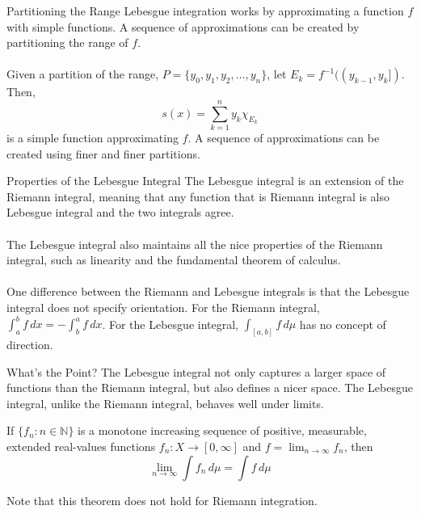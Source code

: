 \documentclass{beamer}
\begin{document}
\begin{frame}{Partitioning the Range}
    Lebesgue integration works by approximating a function $f$ with simple
    functions. A sequence of approximations can be created by partitioning
    the range of $f$.
    \\~\\
    Given a partition of the range, $P = \{y_0, y_1, y_2, \ldots, y_n\}$,
    let $E_k = f^{-1}((y_{k-1}, y_k])$. Then, 
    \[
      s(x) = \sum_{k=1}^{n} y_k \chi_{E_k}  
    \]
    is a simple function approximating $f$. A sequence of approximations
    can be created using finer and finer partitions.
\end{frame}


\begin{frame}{Properties of the Lebesgue Integral}
    The Lebesgue integral is an extension of the Riemann integral,
    meaning that any function that is Riemann integral is also
    Lebesgue integral and the two integrals agree.
    \\~\\
    The Lebesgue integral also maintains all the nice properties
    of the Riemann integral, such as linearity and the fundamental
    theorem of calculus.
    \\~\\
    One difference between the Riemann and Lebesgue integrals is that 
    the Lebesgue integral does not specify orientation. For the Riemann
    integral, $\int_a^b f\,dx = -\int_b^a f\,dx$. For the Lebesgue
    integral, $\int_{[a,b]} f\,d\mu$ has no concept of direction.  
\end{frame}

\begin{frame}{What's the Point?}
    The Lebesgue integral not only captures a larger space of 
    functions than the Riemann integral, but also defines
    a nicer space. The Lebesgue integral, unlike the Riemann
    integral, behaves well under limits.
    \begin{theorem}
        If $\{f_n : n \in \mathbb{N}\}$ is a monotone increasing sequence of positive,
        measurable, extended real-values functions $f_n : X \rightarrow [0,\infty]$ and 
        $f = \lim_{n\to\infty} f_n$, then
        \[
            \lim_{n\to\infty} \int f_n\, d\mu = \int f\,d\mu   
        \]
    \end{theorem}
    Note that this theorem does not hold for Riemann integration.
\end{frame}
\end{document}
